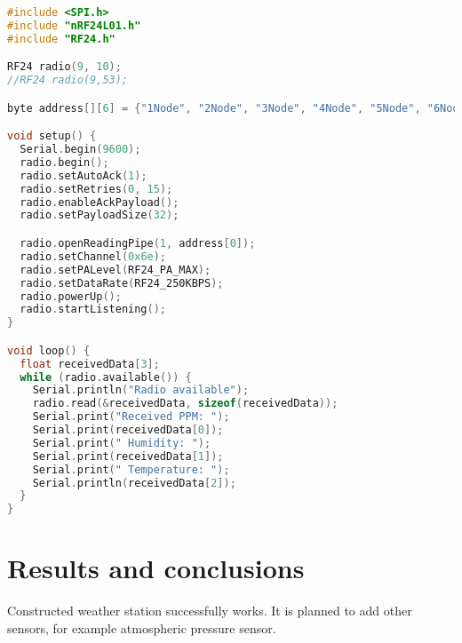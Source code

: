 \documentclass[a4paper,12pt]{article}
\begin{document}
\begin{lstlisting}[language=C++, caption=Weather meteostation receiver's code]
#include <SPI.h>
#include "nRF24L01.h"
#include "RF24.h"

RF24 radio(9, 10);
//RF24 radio(9,53);

byte address[][6] = {"1Node", "2Node", "3Node", "4Node", "5Node", "6Node"};

void setup() {
  Serial.begin(9600);
  radio.begin();
  radio.setAutoAck(1);
  radio.setRetries(0, 15);
  radio.enableAckPayload();
  radio.setPayloadSize(32);

  radio.openReadingPipe(1, address[0]);
  radio.setChannel(0x6e); 
  radio.setPALevel(RF24_PA_MAX);
  radio.setDataRate(RF24_250KBPS);
  radio.powerUp();
  radio.startListening();
}

void loop() {
  float receivedData[3];
  while (radio.available()) {    
    Serial.println("Radio available");  
    radio.read(&receivedData, sizeof(receivedData)); 
    Serial.print("Received PPM: ");
    Serial.print(receivedData[0]);
    Serial.print(" Humidity: ");
    Serial.print(receivedData[1]);
    Serial.print(" Temperature: ");
    Serial.println(receivedData[2]);
  }
}
\end{lstlisting}


\section{Results and conclusions}
Constructed weather station successfully works. It is planned to add other sensors, for example atmospheric pressure sensor.
\end{document}
